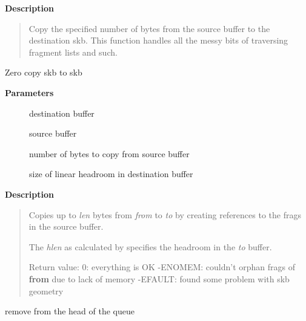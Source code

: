 \documentclass[a4paper,8pt,english]{sphinxmanual}
\begin{document}
\textbf{Description}
\begin{quote}

Copy the specified number of bytes from the source buffer to the
destination skb.  This function handles all the messy bits of
traversing fragment lists and such.
\end{quote}

\begin{fulllineitems}
\label{networking/kapi:c.skb_zerocopy}
Zero copy skb to skb

\end{fulllineitems}


\textbf{Parameters}
\begin{description}
\item[{}] \leavevmode
destination buffer

\item[{}] \leavevmode
source buffer

\item[{}] \leavevmode
number of bytes to copy from source buffer

\item[{}] \leavevmode
size of linear headroom in destination buffer

\end{description}

\textbf{Description}
\begin{quote}

Copies up to \emph{len} bytes from \emph{from} to \emph{to} by creating references
to the frags in the source buffer.

The \emph{hlen} as calculated by  specifies the
headroom in the \emph{to} buffer.

Return value:
0: everything is OK
-ENOMEM: couldn't orphan frags of \textbf{from} due to lack of memory
-EFAULT: {\hyperref[networking/kapi:c.skb_copy_bits]{\emph{}}} found some problem with skb geometry
\end{quote}

\begin{fulllineitems}
remove from the head of the queue

\end{fulllineitems}
\end{document}
